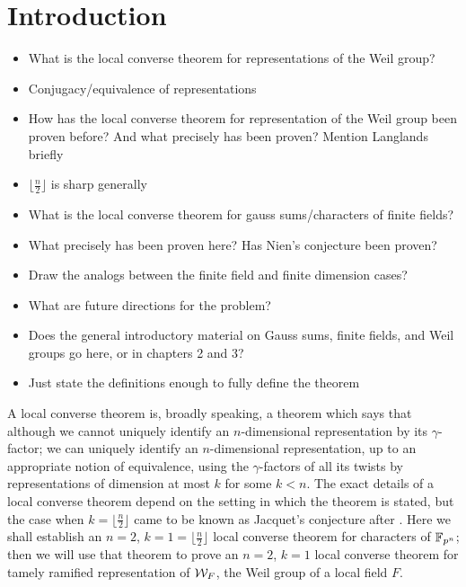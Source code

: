 \chapter{Introduction}	%
\begin{itemize}

\item What is the local converse theorem for representations of the Weil group?
\item Conjugacy/equivalence of representations
\item How has the local converse theorem for representation of the Weil group been proven before? And what precisely has been proven? Mention Langlands briefly
\item $\lfloor \frac{n}{2} \rfloor$ is sharp generally
\item What is the local converse theorem for gauss sums/characters of finite fields?
\item What precisely has been proven here? Has Nien's conjecture been proven?
\item Draw the analogs between the finite field and finite dimension cases?
\item What are future directions for the problem?
\item Does the general introductory material on Gauss sums, finite fields, and Weil groups go here, or in chapters 2 and 3?
\item Just state the definitions enough to fully define the theorem

\end{itemize}

A local converse theorem is, broadly speaking, a theorem which says that although we cannot uniquely identify an $n$-dimensional representation by its $\gamma$-factor; we can uniquely identify an $n$-dimensional representation, up to an appropriate notion of equivalence, using the $\gamma$-factors of all its twists by representations of dimension at most $k$ for some $k < n$.
The exact details of a local converse theorem depend on the setting in which the theorem is stated, but the case when $k = \lfloor \frac{n}{2} \rfloor$ came to be known as Jacquet's conjecture after \cite{Jacquet1983}.
Here we shall establish an $n = 2$, $k=1 = \lfloor \frac{n}{2}\rfloor$ local converse theorem for characters of $\mathbb{F}_{p^n}$; then we will use that theorem to prove an $n=2$, $k=1$ local converse theorem for tamely ramified representation of $\mathcal{W}_F$, the Weil group of a local field $F$.
\\


